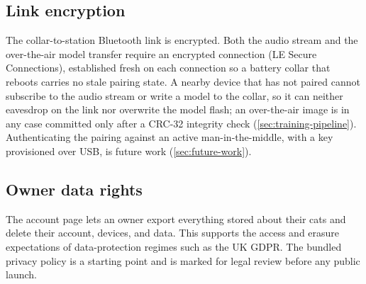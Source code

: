 \subsection{Link encryption}

The collar-to-station Bluetooth link is encrypted. Both the audio stream and the over-the-air model
transfer require an encrypted connection (LE Secure Connections), established fresh on each connection so
a battery collar that reboots carries no stale pairing state. A nearby device that has not paired cannot
subscribe to the audio stream or write a model to the collar, so it can neither eavesdrop on the link nor
overwrite the model flash; an over-the-air image is in any case committed only after a CRC-32 integrity
check (\cref{sec:training-pipeline}). Authenticating the pairing against an active man-in-the-middle, with
a key provisioned over USB, is future work (\cref{sec:future-work}).

\subsection{Owner data rights}

The account page lets an owner export everything stored about their cats and delete their account,
devices, and data. This supports the access and erasure expectations of data-protection regimes such as
the UK GDPR. The bundled privacy policy is a starting point and is marked for legal review before any
public launch.
